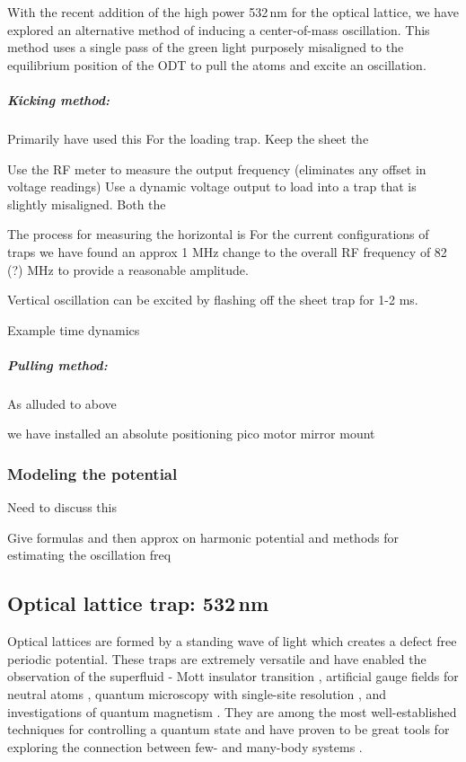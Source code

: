 With the recent addition of the high power 532\,nm for the optical lattice, we have explored an alternative method of inducing a center-of-mass oscillation. This method uses a single pass of the green light purposely misaligned to the equilibrium position of the ODT to pull the atoms and excite an oscillation.

\subparagraph{Kicking method:}
Primarily have used this For the loading trap. Keep the sheet the 

Use the RF meter to measure the output frequency (eliminates any offset in voltage readings)
Use a dynamic voltage output to load into a trap that is slightly misaligned. Both the 

The process for measuring the horizontal is 
For the current configurations of traps we have found an approx 1 MHz change to the overall RF frequency of 82 (?) MHz to provide a reasonable amplitude. 

Vertical oscillation can be excited by flashing off the sheet trap for 1-2 ms. 

Example time dynamics

\subparagraph{Pulling method:}

As alluded to above

we have installed an absolute positioning pico motor mirror mount 

\subsubsection{Modeling the potential} \label{sssec:1064_modeling}

Need to discuss this

Give formulas and then approx on harmonic potential and methods for estimating the oscillation freq

\subsection{Optical lattice trap: 532\,nm} \label{ssec:532sys}

Optical lattices are formed by a standing wave of light which creates a defect free periodic potential.
These traps are extremely versatile and have enabled the observation of the superfluid - Mott insulator transition \cite{Greiner2002}, artificial gauge fields for neutral atoms \cite{Lin2011}, quantum microscopy with single-site resolution \cite{Bakr2009}, and investigations of quantum magnetism \cite{Hart2015,Greif2015}. 
They are among the most well-established techniques for controlling a quantum state and have proven to be great tools for exploring the connection between few- and many-body systems \cite{Bloch2008}.

